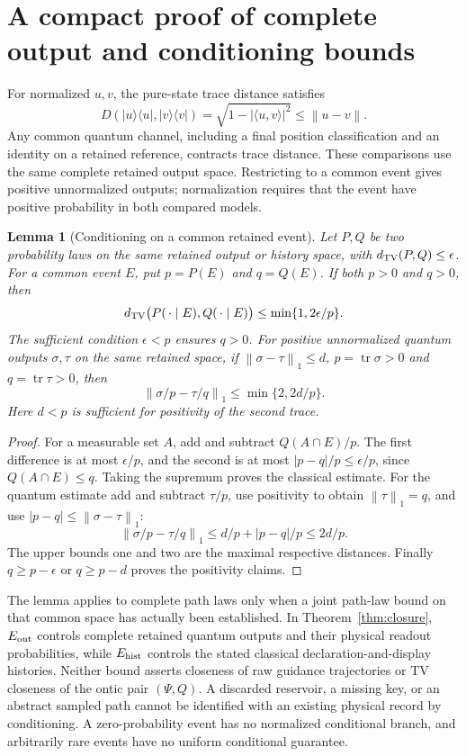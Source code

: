 \documentclass[11pt]{article}
\newtheorem{lemma}[theorem]{Lemma}
\theoremstyle{definition}\newtheorem{assumption}[theorem]{Constitutive assumption}
\theoremstyle{remark}\newtheorem{remark}[theorem]{Remark}
\newcommand{\ket}[1]{|#1\rangle}\newcommand{\bra}[1]{\langle#1|}
\newcommand{\tr}{\operatorname{tr}}\newcommand{\E}{\mathbb E}
\newcommand{\norm}[1]{\left\|#1\right\|}\newcommand{\pos}[1]{[#1]_+}
\begin{document}
\appendix
\section{A compact proof of complete output and conditioning bounds}
\label{app:conditioning}
For normalized $u,v$, the pure-state trace distance satisfies
\[
 D(\ket u\bra u,\ket v\bra v)
 =\sqrt{1-|\langle u,v\rangle|^2}\le\norm{u-v}.
\]
Any common quantum channel, including a final position classification and an identity on a retained reference, contracts trace distance. These comparisons use the same complete retained output space. Restricting to a common event gives positive unnormalized outputs; normalization requires that the event have positive probability in both compared models.

\begin{lemma}[Conditioning on a common retained event]
\label{lem:conditional-bound}
Let $P,Q$ be two probability laws on the same retained output or history space, with $d_{\rm TV}(P,Q)\le\epsilon$. For a common event $E$, put $p=P(E)$ and $q=Q(E)$. If \emph{both} $p>0$ and $q>0$, then
\[
 d_{\rm TV}\bigl(P(\,\cdot\mid E),Q(\,\cdot\mid E)\bigr)
 \le\min\{1,2\epsilon/p\}.
\]
The sufficient condition $\epsilon<p$ ensures $q>0$. For positive unnormalized quantum outputs $\sigma,\tau$ on the same retained space, if $\norm{\sigma-\tau}_1\le d$, $p=\tr\sigma>0$ and $q=\tr\tau>0$, then
\[
 \norm{\sigma/p-\tau/q}_1\le\min\{2,2d/p\}.
\]
Here $d<p$ is sufficient for positivity of the second trace.
\end{lemma}
\begin{proof}
For a measurable set $A$, add and subtract $Q(A\cap E)/p$. The first difference is at most $\epsilon/p$, and the second is at most $|p-q|/p\le\epsilon/p$, since $Q(A\cap E)\le q$. Taking the supremum proves the classical estimate. For the quantum estimate add and subtract $\tau/p$, use positivity to obtain $\norm{\tau}_1=q$, and use $|p-q|\le\norm{\sigma-\tau}_1$:
\[
 \norm{\sigma/p-\tau/q}_1
 \le d/p+|p-q|/p\le2d/p.
\]
The upper bounds one and two are the maximal respective distances. Finally $q\ge p-\epsilon$ or $q\ge p-d$ proves the positivity claims.
\end{proof}

The lemma applies to complete path laws only when a joint path-law bound on that common space has actually been established. In Theorem~\ref{thm:closure}, $E_{\rm out}$ controls complete retained quantum outputs and their physical readout probabilities, while $E_{\rm hist}$ controls the stated classical declaration-and-display histories. Neither bound asserts closeness of raw guidance trajectories or TV closeness of the ontic pair $(\Psi,Q)$. A discarded reservoir, a missing key, or an abstract sampled path cannot be identified with an existing physical record by conditioning. A zero-probability event has no normalized conditional branch, and arbitrarily rare events have no uniform conditional guarantee.
\end{document}
